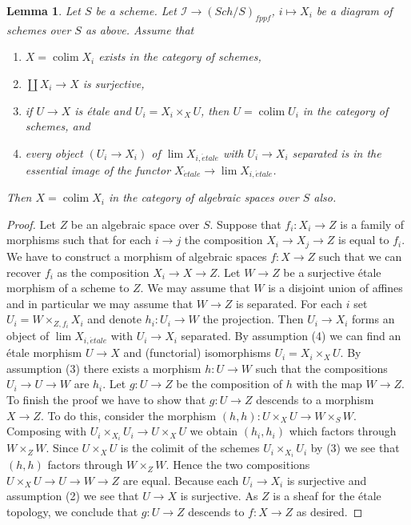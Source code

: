 \documentclass{stacks-project}
\theoremstyle{plain}
\newtheorem{lemma}[subsection]{Lemma}
\theoremstyle{definition}
\theoremstyle{remark}
\numberwithin{equation}{subsection}
\def\lim{\mathop{\mathrm{lim}}\nolimits}
\def\colim{\mathop{\mathrm{colim}}\nolimits}
\def\Sch{\mathit{Sch}}
\def\etale{{\acute{e}tale}}
\begin{document}
\begin{lemma}
\label{lemma-colimit-agrees}
Let $S$ be a scheme. Let $\mathcal{I} \to (\Sch/S)_{fppf}$, $i \mapsto X_i$
be a diagram of schemes over $S$ as above. Assume that
\begin{enumerate}
\item $X = \colim X_i$ exists in the category of schemes,
\item $\coprod X_i \to X$ is surjective,
\item if $U \to X$ is \'etale and $U_i = X_i \times_X U$, then
$U = \colim U_i$ in the category of schemes, and
\item every object $(U_i \to X_i)$ of $\lim X_{i, \etale}$
with $U_i \to X_i$ separated is in the essential image of
the functor $X_\etale \to \lim X_{i, \etale}$.
\end{enumerate}
Then $X = \colim X_i$ in the category of algebraic spaces over $S$ also.
\end{lemma}

\begin{proof}
Let $Z$ be an algebraic space over $S$. Suppose that $f_i : X_i \to Z$ is
a family of morphisms such that for each $i \to j$ the composition
$X_i \to X_j \to Z$ is equal to $f_i$. We have to construct a morphism
of algebraic spaces $f : X \to Z$ such that we can recover $f_i$ as
the composition $X_i \to X \to Z$. Let $W \to Z$ be a surjective
\'etale morphism of a scheme to $Z$. We may assume that $W$ is a
disjoint union of affines and in particular we may assume that
$W \to Z$ is separated. For each $i$ set
$U_i = W \times_{Z, f_i} X_i$ and denote $h_i : U_i \to W$ the projection.
Then $U_i \to X_i$ forms an object of $\lim X_{i, \etale}$
with $U_i \to X_i$ separated. By
assumption (4) we can find an \'etale morphism $U \to X$ and (functorial)
isomorphisms $U_i = X_i \times_X U$. By assumption (3) there exists a morphism
$h : U \to W$ such that the compositions $U_i \to U \to W$ are $h_i$.
Let $g : U \to Z$ be the composition of $h$ with the map $W \to Z$. To
finish the proof we have to show that $g : U \to Z$ descends to a morphism
$X \to Z$. To do this, consider the morphism
$(h, h) : U \times_X U \to W \times_S W$.
Composing with $U_i \times_{X_i} U_i \to U \times_X U$ we obtain
$(h_i, h_i)$ which factors through $W \times_Z W$. Since $U \times_X U$
is the colimit of the schemes $U_i \times_{X_i} U_i$ by (3) we see
that $(h, h)$ factors through $W \times_Z W$. Hence the two compositions
$U \times_X U \to U \to W \to Z$ are equal. Because each $U_i \to X_i$ is
surjective and assumption (2) we see that $U \to X$ is surjective.
As $Z$ is a sheaf for the \'etale topology, we conclude that
$g : U \to Z$ descends to $f : X \to Z$ as desired.
\end{proof}
\end{document}
